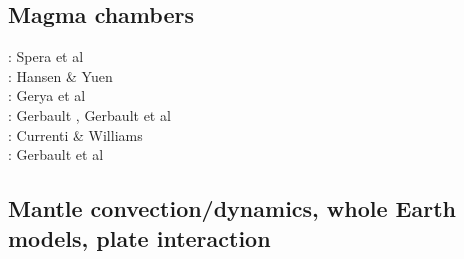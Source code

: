 \subsection{Magma chambers}

\begin{scriptsize}
\nineteeneightytwo: Spera et al \cite{spyk82}\\
\nineteeneightyseven: Hansen \& Yuen \cite{hayu87}\\
\twothousandfour: Gerya et al \cite{geys04}\\
\twothousandtwelve: Gerbault \cite{gerb12}, Gerbault et al \cite{gech12}\\
\twothousandfourteen: Currenti \& Williams \cite{cuwi14}\\
\twothousandeighteen: Gerbault et al \cite{gehn18}
\end{scriptsize}

\subsection{Mantle convection/dynamics, whole Earth models, plate interaction}

